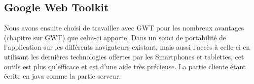 \subsection{Google Web Toolkit}

Nous avons ensuite choisi de travailler avec GWT pour les nombreux avantages (chapitre sur GWT) que celui-ci apporte. Dans un souci de portabilité de l'application sur les différents navigateurs existant, mais aussi l'accès à celle-ci en utilisant les dernières technologies offertes par les Smartphones et tablettes, cet outils est plus qu'efficace et est d'une aide très précieuse. La partie cliente étant écrite en java comme la partie serveur.


